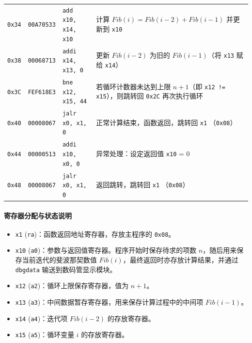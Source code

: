 \documentclass[12pt, a4paper]{ctexart}
\begin{document}
\begin{table}[htbp]
\begin{tabular}{cclp{6.0cm}}
        \texttt{0x34} & \texttt{00A70533} & \texttt{add x10, x14, x10} & 计算 $Fib(i) = Fib(i-2) + Fib(i-1)$ 并更新到 \texttt{x10} \\
        \texttt{0x38} & \texttt{00068713} & \texttt{addi x14, x13, 0} & 更新 $Fib(i-2)$ 为旧的 $Fib(i-1)$（将 \texttt{x13} 赋给 \texttt{x14}） \\
        \texttt{0x3C} & \texttt{FEF618E3} & \texttt{bne x12, x15, 44} & 若循环计数器未达到上限 $n+1$（即 \texttt{x12 != x15}），则跳转回 \texttt{0x2C} 再次执行循环 \\
        \texttt{0x40} & \texttt{00008067} & \texttt{jalr x0, x1, 0} & 正常计算结束，函数返回，跳转回 \texttt{x1} （\texttt{0x08}） \\
        \texttt{0x44} & \texttt{00000513} & \texttt{addi x10, x0, 0} & 异常处理：设定返回值 \texttt{x10} = 0 \\
        \texttt{0x48} & \texttt{00008067} & \texttt{jalr x0, x1, 0} & 返回跳转，跳转回 \texttt{x1} （\texttt{0x08}） \\
        \bottomrule
    \end{tabular}
\end{table}

\paragraph{寄存器分配与状态说明}
\begin{itemize}
    \item \texttt{x1} (\texttt{ra})：函数返回地址寄存器，存放主程序的 \texttt{0x08}。
    \item \texttt{x10} (\texttt{a0})：参数与返回值寄存器。程序开始时保存待求的项数 $n$，随后用来保存当前迭代的斐波那契数值
    $Fib(i)$，最终返回时亦存放计算结果，并通过 \texttt{dbgdata} 输送到数码管显示模块。
    \item \texttt{x12} (\texttt{a2})：循环上限保存寄存器，值为 $n+1$。
    \item \texttt{x13} (\texttt{a3})：中间数据暂存寄存器，用来保存计算过程中的中间项 $Fib(i-1)$。
    \item \texttt{x14} (\texttt{a4})：迭代项 $Fib(i-2)$ 的存放寄存器。
    \item \texttt{x15} (\texttt{a5})：循环变量 $i$ 的存放寄存器。
\end{itemize}
\end{document}
